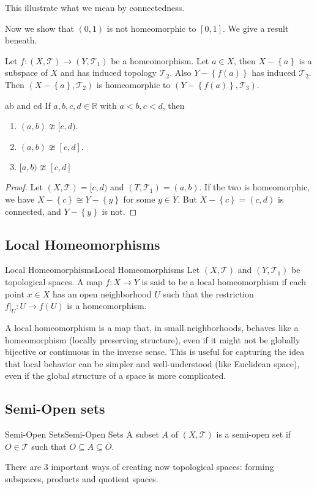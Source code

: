 \documentclass[../main.tex]{subfiles}
\begin{document}
This illustrate what we mean by connectedness.

Now we show that $(0,1)$ is not homeomorphic to $[0,1]$. We give a result beneath.

Let $f:(X,\mathcal{T})\rightarrow (Y,\mathcal{T}_1)$ be a homeomorphism. Let $a\in X$, then $X-\left\{ a \right\}$ is a subspace of $X$ and has induced topology $\mathcal{T}_2$. Also $Y-\left\{ f(a) \right\}$ has induced $\mathcal{T}_2$. Then $(X-\left\{ a \right\}, \mathcal{T}_2)$ is homeomorphic to $(Y-\left\{ f(a) \right\}, \mathcal{T}_3)$.

\begin{corollary}{}{ab and cd}
If $a,b,c,d\in \mathbb{R}$ with $a<b,c<d$, then
\begin{enumerate}
	\item $(a,b) \ncong [c,d)$.
	\item $(a,b) \ncong [c,d]$.
	\item $[a,b) \ncong [c,d]$
\end{enumerate}
\end{corollary}
\begin{proof}
Let $(X,\mathcal{T}) = [c,d)$ and $(T,\mathcal{T}_1) = (a,b)$. If the two is homeomorphic, we have $X-\left\{ c \right\}\cong Y-\left\{ y \right\}$ for some $y\in Y$. But $X-\left\{ c \right\}=(c,d)$ is connected, and $Y-\left\{ y \right\}$ is not.
\end{proof}

\subsection{Local Homeomorphisms}
\begin{definition}{Local Homeomorphisms}{Local Homeomorphisms}
Let $(X,\mathcal{T})$ and $(Y,\mathcal{T}_1)$ be topological spaces. A map $f:X \rightarrow Y$ is said to be a local homeomorphism if each point $x\in X$ has an open neighborhood $U$ such that the restriction $f|_U: U \rightarrow f(U)$ is a homeomorphism.
\end{definition}
\begin{remark}
A local homeomorphism is a map that, in small neighborhoods, behaves like a homeomorphism (locally preserving structure), even if it might not be globally bijective or continuous in the inverse sense. This is useful for capturing the idea that local behavior can be simpler and well-understood (like Euclidean space), even if the global structure of a space is more complicated.
\end{remark}

\subsection{Semi-Open sets}
\begin{definition}{Semi-Open Sets}{Semi-Open Sets}
A subset $A$ of $(X,\mathcal{T})$ is a semi-open set if $O\in \mathcal{T}$ such that $O \subseteq A \subseteq \overline{O}$.
\end{definition}

There are 3 important ways of creating now topological spaces: forming subspaces, products and quotient spaces.
\end{document}
